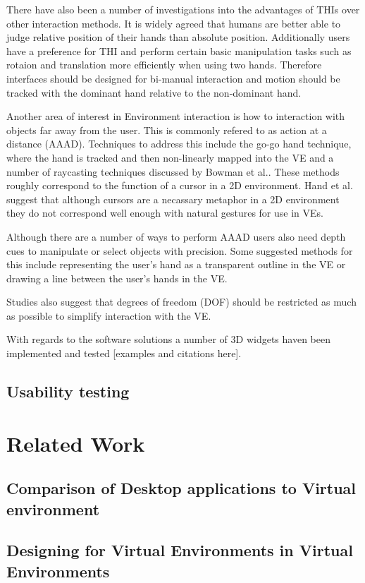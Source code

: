 \documentclass{sig-alternate-05-2015}
\begin{document}
 There have also been a number of investigations into the advantages of THIs over other interaction methods. It is widely agreed that humans are better able to judge relative position of their hands than absolute position.\cite{Bowman1998, Buxton1986} Additionally users have a preference for THI\cite{Buxton1986} and perform certain basic manipulation tasks such as rotaion and translation more efficiently when using two hands.\cite{Schultheis2012} Therefore interfaces should be designed for bi-manual interaction and motion should be tracked with the dominant hand relative to the non-dominant hand.\cite{Hinckley1994}
 
 Another area of interest in Environment interaction is how to interaction with objects far away from the user. This is commonly refered to as action at a distance (AAAD). Techniques to address this include the go-go hand technique\cite{Poupyrev1996}, where the hand is tracked and then non-linearly mapped into the VE and a number of raycasting techniques discussed by Bowman et al.\cite{Bowman2001}. These methods roughly correspond to the function of a cursor in a 2D environment. Hand et al. suggest that although cursors are a necassary metaphor in a 2D environment they do not correspond well enough with natural gestures for use in VEs.\cite{Hand1997}
 
 Although there are a number of ways to perform AAAD users also need depth cues to manipulate or select objects with precision.\cite{Schultheis2012} Some suggested methods for this include representing the user's hand as a transparent outline in the VE\cite{Hinckley1994} or drawing a line between the user's hands in the VE.\cite{Schultheis2012}
 
 
 Studies also suggest that degrees of freedom (DOF) should be restricted as much as possible to simplify interaction with the VE.\cite{Bowman2001}
 
 
  With regards to the software solutions a number of 3D widgets haven been implemented and tested [examples and citations here].
 

\subsection{Usability testing}
\section{Related Work}
\subsection{Comparison of Desktop applications to Virtual environment}
\subsection{Designing for Virtual Environments in Virtual Environments}



\end{document}
